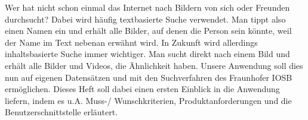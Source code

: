 Wer hat nicht schon einmal das Internet nach Bildern von sich oder Freunden durchsucht? Dabei wird häufig textbasierte Suche verwendet. Man tippt also einen Namen ein und erhält alle Bilder, auf denen die Person sein könnte, weil der Name im Text nebenan erwähnt wird. In Zukunft wird allerdings inhaltsbasierte Suche immer wichtiger. Man sucht direkt nach einem Bild und erhält alle Bilder und Videos, die Ähnlichkeit haben.
\newline
Unsere Anwendung soll dies nun auf eigenen Datensätzen und mit den Suchverfahren des Fraunhofer IOSB ermöglichen.
\newline
Dieses Heft soll dabei einen ersten Einblick in die Anwendung liefern, indem es u.A. Muss-/ Wunschkriterien, Produktanforderungen und die Benutzerschnittstelle erläutert.
